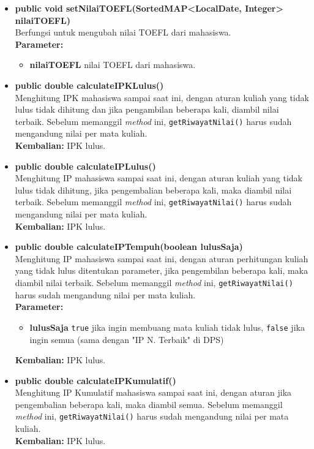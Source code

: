 \begin{enumerate}
\begin{enumerate}
\begin{itemize}
			\item \textbf{public void setNilaiTOEFL(SortedMAP<LocalDate, Integer> nilaiTOEFL)}\\
				Berfungsi untuk mengubah nilai TOEFL dari mahasiswa.\\
				\textbf{Parameter:}
				\begin{itemize}
					\item \textbf{nilaiTOEFL} nilai TOEFL dari mahasiswa.
				\end{itemize}
			 
			 \item \textbf{public double calculateIPKLulus()}\\
				Menghitung IPK mahasiswa sampai saat ini, dengan aturan kuliah yang tidak lulus tidak dihitung dan jika pengambilan beberapa kali, diambil nilai terbaik. Sebelum memanggil \textit{method} ini, \texttt{getRiwayatNilai()} harus sudah mengandung nilai per mata kuliah.\\
				\textbf{Kembalian:} IPK lulus.
			
			\item \textbf{public double calculateIPLulus()}\\
				Menghitung IP mahasiswa sampai saat ini, dengan aturan kuliah yang tidak lulus tidak dihitung, jika pengembalian beberapa kali, maka diambil nilai terbaik. Sebelum memanggil \textit{method} ini, \texttt{getRiwayatNilai()} harus sudah mengandung nilai per mata kuliah.\\
				\textbf{Kembalian:}  IPK lulus.
			
			\item \textbf{public double calculateIPTempuh(boolean lulusSaja)}\\
				Menghitung IP mahasiswa sampai saat ini, dengan aturan perhitungan kuliah yang tidak lulus ditentukan parameter, jika pengembilan beberapa kali, maka diambil nilai terbaik. Sebelum memanggil \textit{method} ini, \texttt{getRiwayatNilai()} harus sudah mengandung nilai per mata kuliah.\\
				\textbf{Parameter:} 
				\begin{itemize}
					\item \textbf{lulusSaja} \texttt{true} jika ingin membuang mata kuliah tidak lulus, \texttt{false} jika ingin semua (sama dengan "IP N. Terbaik" di DPS)
				\end{itemize}
				\textbf{Kembalian:}  IPK lulus.
			
			\item \textbf{public double calculateIPKumulatif()}\\
				Menghitung IP Kumulatif mahasiswa sampai saat ini, dengan aturan jika pengembalian beberapa kali, maka diambil semua. Sebelum memanggil \textit{method} ini, \texttt{getRiwayatNilai()} harus sudah mengandung nilai per mata kuliah.\\
				\textbf{Kembalian:}  IPK lulus.
				

\end{itemize}
\end{enumerate}
\end{enumerate}
